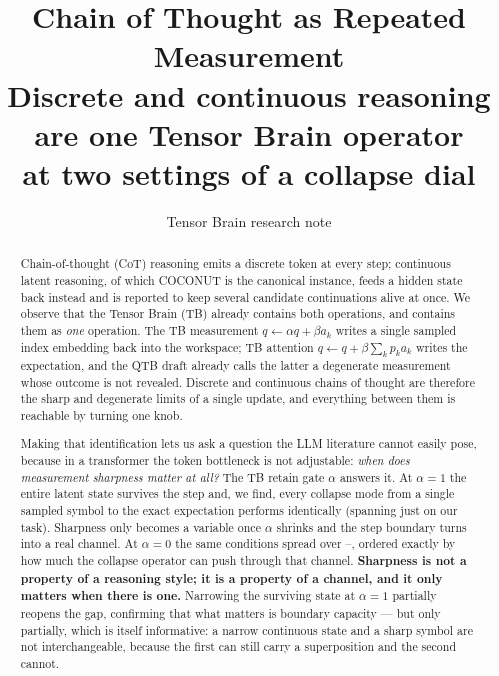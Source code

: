 \documentclass[11pt]{article}
\title{\textbf{Chain of Thought as Repeated Measurement}\\[2mm]
\large Discrete and continuous reasoning are one Tensor Brain operator\\
at two settings of a collapse dial}
\author{Tensor Brain research note}
\date{}
\theoremstyle{definition}
\begin{document}
\maketitle

\begin{abstract}
Chain-of-thought (CoT) reasoning emits a discrete token at every step; continuous
latent reasoning, of which COCONUT \citep{hao2024coconut} is the canonical
instance, feeds a hidden state back instead and is reported to keep several
candidate continuations alive at once. We observe that the Tensor Brain (TB)
already contains both operations, and contains them as \emph{one} operation. The
TB measurement $q \leftarrow \alpha q + \beta a_k$ writes a single sampled index
embedding back into the workspace; TB attention
$q \leftarrow q + \beta \sum_k p_k a_k$ writes the expectation, and the QTB draft
\citep{tresp2025bayes} already calls the latter a degenerate measurement whose
outcome is not revealed. Discrete and continuous chains of thought are therefore
the sharp and degenerate limits of a single update, and everything between them
is reachable by turning one knob.

Making that identification lets us ask a question the LLM literature cannot easily
pose, because in a transformer the token bottleneck is not adjustable: \emph{when
does measurement sharpness matter at all?} The TB retain gate $\alpha$ answers it.
At $\alpha = 1$ the entire latent state survives the step and, we find, every
collapse mode from a single sampled symbol to the exact expectation performs
identically (spanning just \OpenMeanSpread on our task). Sharpness only becomes a
variable once $\alpha$ shrinks and the step boundary turns into a real channel. At
$\alpha = 0$ the same conditions spread over \BottleneckMin--\BottleneckMax,
ordered exactly by how much the collapse operator can push through that channel.
\textbf{Sharpness is not a property of a reasoning style; it is a property of a
channel, and it only matters when there is one.} Narrowing the surviving state at
$\alpha = 1$ partially reopens the gap, confirming that what matters is boundary
capacity --- but only partially, which is itself informative: a narrow continuous
state and a sharp symbol are not interchangeable, because the first can still carry a
superposition and the second cannot.


\end{abstract}
\end{document}
